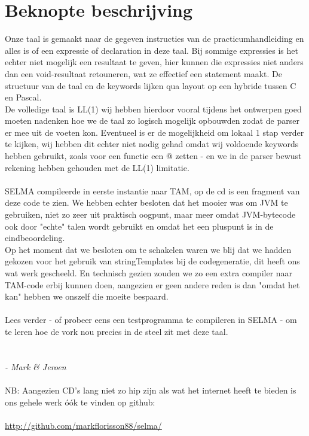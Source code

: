 \documentclass[]{article}
\begin{document}
\section{Beknopte beschrijving}
Onze taal is gemaakt naar de gegeven instructies van de practicumhandleiding en alles is of een expressie of declaration in deze taal. Bij sommige expressies is het echter niet mogelijk een resultaat te geven, hier kunnen die expressies niet anders dan een void-resultaat retouneren, wat ze effectief een statement maakt. De structuur van de taal en de keywords lijken qua layout op een hybride tussen C en Pascal. \\
De volledige taal is LL(1) wij hebben hierdoor vooral tijdens het ontwerpen goed moeten nadenken hoe we de taal zo logisch mogelijk opbouwden zodat de parser er mee uit de voeten kon. Eventueel is er de mogelijkheid om lokaal 1 stap verder te kijken, wij hebben dit echter niet nodig gehad omdat wij voldoende keywords hebben gebruikt, zoals voor een functie een @ zetten - en we in de parser bewust rekening hebben gehouden met de LL(1) limitatie.\\
\\
SELMA compileerde in eerste instantie naar TAM, op de cd is een fragment van deze code te zien. We hebben echter besloten dat het mooier was om JVM te gebruiken, niet zo zeer uit praktisch oogpunt, maar meer omdat JVM-bytecode ook door "echte" talen wordt gebruikt en omdat het een pluspunt is in de eindbeoordeling.\\
Op het moment dat we besloten om te schakelen waren we blij dat we hadden gekozen voor het gebruik van stringTemplates bij de codegeneratie, dit heeft ons wat werk gescheeld. En technisch gezien zouden we zo een extra compiler naar TAM-code erbij kunnen doen, aangezien er geen andere reden is dan "omdat het kan" hebben we onszelf die moeite bespaard.\\
\\
Lees verder - of probeer eens een testprogramma te compileren in SELMA - om te leren hoe de vork nou precies in de steel zit met deze taal.\\
\\
\\
\textit{- Mark \& Jeroen}\\
\\
NB: Aangezien CD's lang niet zo hip zijn als wat het internet heeft te bieden is ons gehele werk \'{o}\'{o}k te vinden op github: \\
\\
\url{http://github.com/markflorisson88/selma/}
\end{document}
